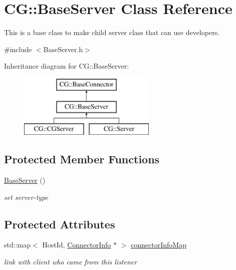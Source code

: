 \hypertarget{class_c_g_1_1_base_server}{}\section{CG\+:\+:Base\+Server Class Reference}
\label{class_c_g_1_1_base_server}


This is a base class to make child server class that can use developers.  




{\ttfamily \#include $<$Base\+Server.\+h$>$}

Inheritance diagram for CG\+:\+:Base\+Server\+:\begin{figure}[H]
\begin{center}
\leavevmode
\includegraphics[height=3.000000cm]{class_c_g_1_1_base_server}
\end{center}
\end{figure}
\subsection*{Protected Member Functions}
\begin{DoxyCompactItemize}
\item 
\mbox{\label{class_c_g_1_1_base_server_acef9aec3b6c194d413802218597737c0}} 
\mbox{\hyperlink{class_c_g_1_1_base_server_acef9aec3b6c194d413802218597737c0}{Base\+Server}} ()
\begin{DoxyCompactList}\small\item\em set server-\/type \end{DoxyCompactList}\end{DoxyCompactItemize}
\subsection*{Protected Attributes}
\begin{DoxyCompactItemize}
\item 
std\+::map$<$ Host\+Id, \mbox{\hyperlink{class_c_g_1_1_connector_info}{Connector\+Info}} $\ast$ $>$ \mbox{\hyperlink{class_c_g_1_1_base_server_a873e8a48776e1545c06b3dc0e20bdeda}{connector\+Info\+Map}}
\begin{DoxyCompactList}\small\item\em link with client who came from this listener \end{DoxyCompactList}\end{DoxyCompactItemize}
